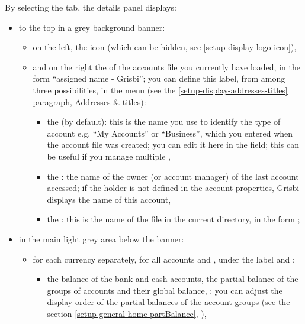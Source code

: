By selecting the  tab, the details panel displays:

\begin{itemize}
	\item to the top in a grey background banner:
	\begin{itemize}
		\item on the left, the  icon (which can be hidden, see \vref{setup-display-logo-icon}),
		\item and on the right the  of the accounts file you currently have loaded, in the form \enquote{assigned name - Grisbi}; you can define this label, from among three possibilities, in the  menu (see the \vref{setup-display-addresses-titles} paragraph, Addresses \& titles):
		\begin{itemize}
			\item the  (by default): this is the name you use to identify the type of account e.g. \enquote{My Accounts} or \enquote{Business}, which you entered when the account file was created; you can edit it here in the  field; this can be useful if you manage multiple , 
			\item the : the name of the owner (or account manager) of the last account accessed; if the holder is not defined in the account properties, Grisbi displays the name of this account,
			\item the : this is the name of the file in the current directory, in the form  ;
		\end{itemize}
	\end{itemize}
	\item in the main light grey area below the banner:
	\begin{itemize}
		\item for each currency separately, for all accounts and , under the label  and :
		\begin{itemize}
			\item the balance of the bank and cash accounts, the partial balance of the groups of accounts and their global balance,
			\newline
			\Note{}: you can adjust the display order of the partial balances of the account groups (see the section \vref{setup-general-home-partBalance}, ),		 

\end{itemize}
\end{itemize}
\end{itemize}
